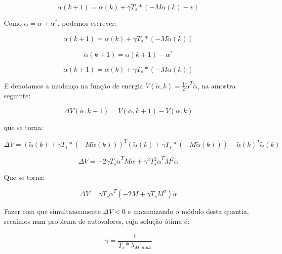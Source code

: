 \documentclass[11pt]{report}
\begin{document}
\begin{equation}
\alpha(k+1) = \alpha(k) + \gamma T_s*(-M \alpha(k) - v)
\end{equation}

Como $\alpha = \tilde{\alpha} + \alpha^*$, podemos escrever:

\begin{equation}
\alpha(k+1) = \alpha(k) + \gamma T_s*(-M \tilde{\alpha}(k))
\end{equation}

\begin{equation}
\tilde{\alpha}(k+1) = \alpha(k+1) - \alpha^*
\end{equation}

\begin{equation}
\tilde{\alpha}(k+1) = \tilde{\alpha}(k) + \gamma T_s*(-M \tilde{\alpha}(k))
\end{equation}

E denotamos a mudança na função de energia $V(\tilde{\alpha}, k) = \frac{1}{2}\tilde{\alpha}^T\tilde{\alpha} $, na amostra seguinte:

\begin{equation}
\Delta V(\tilde{\alpha}, k+1) = V(\tilde{\alpha}, k+1) - V(\tilde{\alpha}, k)
\end{equation}

que se torna:

\begin{equation}
\Delta V = (\tilde{\alpha}(k) + \gamma T_s*(-M \tilde{\alpha}(k)))^T(\tilde{\alpha}(k) + \gamma T_s*(-M \tilde{\alpha}(k))) - \tilde{\alpha}(k)^T\tilde{\alpha}(k)
\end{equation}

\begin{equation}
\Delta V = -2 \gamma T_s\tilde{\alpha}^T M \tilde{\alpha} + \gamma^2 T_s^2\tilde{\alpha}^T M^2 \tilde{\alpha} 
\end{equation}

Que se torna:

\begin{equation}
\Delta V = \gamma T_s \tilde{\alpha}^T (-2M + \gamma T_s M^2)\tilde{\alpha}
\end{equation}

Fazer com que simultaneamente $\Delta V<0$ e maximizando o módulo desta quantia, recaímos num problema de autovalores, cuja solução ótima é:

\begin{equation}
\gamma = \frac{1}{T_s * \lambda_{M, max}}
\end{equation}
\end{document}
